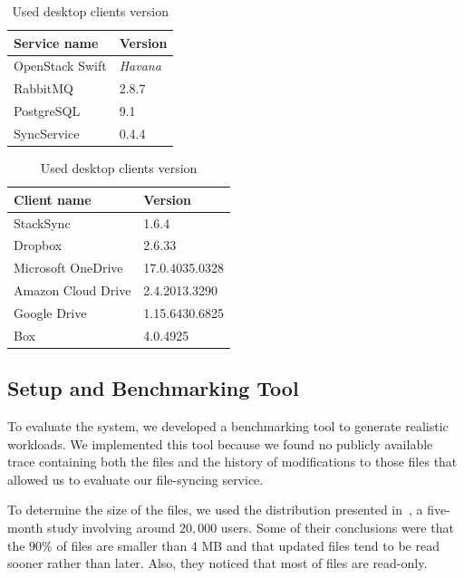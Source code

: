 \begin{table}[!htb]
    \begin{minipage}{.5\linewidth}
      \centering
        \begin{tabular}{ | l | l | }
    	\hline
    	Service name & Version \\ \hline
    	OpenStack Swift & \textit{Havana} \\
    	RabbitMQ & 2.8.7 \\
    	PostgreSQL & 9.1 \\
    	SyncService & 0.4.4 \\ \hline
    	\end{tabular}
    \caption{Used services version}
    \label{table:services}
    \end{minipage}%
    \begin{minipage}{.5\linewidth}
      \centering
        \begin{tabular}{ | l | l | }
    	\hline
    	Client name & Version \\ \hline
    	StackSync & 1.6.4 \\
    	Dropbox & 2.6.33 \\
    	Microsoft OneDrive & 17.0.4035.0328 \\
    	Amazon Cloud Drive & 2.4.2013.3290 \\ 
    	Google Drive & 1.15.6430.6825 \\ 
    	Box & 4.0.4925 \\ \hline
    	\end{tabular}
    \caption{Used desktop clients version}
    \label{table:clients}
    \end{minipage} 
\end{table}

\subsection{Setup and Benchmarking Tool}

To evaluate the system, we developed a benchmarking tool to generate
realistic workloads. We implemented this tool because we found no publicly available trace containing both 
the files and the history of modifications to those files that allowed us to evaluate our file-syncing service.

To determine the size of the files, we used the distribution presented in~\cite{liu2013},
a five-month study involving around $20,000$ users. Some of their conclusions
were that the $90\%$ of files are smaller than $4$ MB and that updated files tend to be read sooner
rather than later. Also, they noticed that most of files are read-only.

